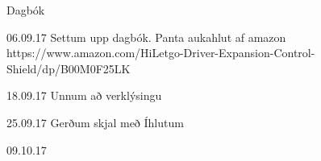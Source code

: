 Dagbók

06.09.17
Settum upp dagbók. Panta aukahlut af amazon https://www.amazon.com/HiLetgo-Driver-Expansion-Control-Shield/dp/B00M0F25LK

18.09.17
Unnum að verklýsingu

25.09.17
Gerðum skjal með Íhlutum

09.10.17
